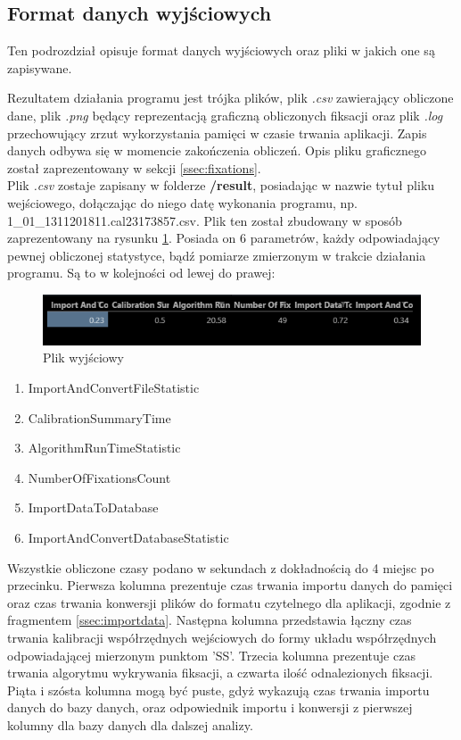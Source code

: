 \subsection{Format danych wyjściowych}
Ten podrozdział opisuje format danych wyjściowych oraz pliki w jakich one są zapisywane.\par
Rezultatem działania programu jest trójka plików, plik \emph{.csv} zawierający obliczone dane, plik \emph{.png} będący reprezentacją graficzną obliczonych fiksacji oraz plik \emph{.log} przechowujący zrzut wykorzystania pamięci w czasie trwania aplikacji. Zapis danych odbywa się w momencie zakończenia obliczeń. Opis pliku graficznego został zaprezentowany w sekcji \ref{ssec:fixations}.\\
Plik \emph{.csv} zostaje zapisany w folderze \textbf{/result}, posiadając w nazwie tytuł pliku wejściowego, dołączając do niego datę wykonania programu, np. 1\_01\_1311201811.cal23\-173857.csv.
Plik ten został zbudowany w sposób zaprezentowany na rysunku \ref{fig:exportfile}. Posiada on 6 parametrów, każdy odpowiadający pewnej obliczonej statystyce, bądź pomiarze zmierzonym w trakcie działania programu. Są to w kolejności od lewej do prawej:
\begin{figure}[H]
        \centering
        \captionsetup{justification=centering,margin=2cm}
        \includegraphics[width=0.8\linewidth]{resources/exportfile.png}
        \caption{Plik wyjściowy}
        \label{fig:exportfile}
\end{figure}
\begin{enumerate}[itemsep=1pt] 
        \item ImportAndConvertFileStatistic
        \item CalibrationSummaryTime
        \item AlgorithmRunTimeStatistic
        \item NumberOfFixationsCount
        \item ImportDataToDatabase
        \item ImportAndConvertDatabaseStatistic
\end{enumerate}
Wszystkie obliczone czasy podano w sekundach z dokładnością do 4 miejsc po przecinku. Pierwsza kolumna prezentuje czas trwania importu danych do pamięci oraz czas trwania konwersji plików do formatu czytelnego dla aplikacji, zgodnie z fragmentem \ref{ssec:importdata}. Następna kolumna przedstawia łączny czas trwania kalibracji współrzędnych wejściowych do formy układu współrzędnych odpowiadającej mierzonym punktom 'SS'. Trzecia kolumna prezentuje czas trwania algorytmu wykrywania fiksacji, a czwarta ilość odnalezionych fiksacji. Piąta i szósta kolumna mogą być puste, gdyż wykazują czas trwania importu danych do bazy danych, oraz odpowiednik importu i konwersji z pierwszej kolumny dla bazy danych dla dalszej analizy.\\
